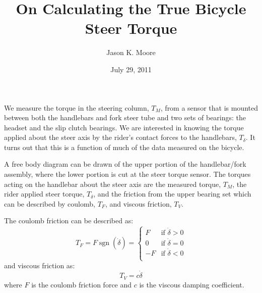 \documentclass[]{article}
\title{On Calculating the True Bicycle Steer Torque}
\author{Jason K. Moore}
\date{July 29, 2011}
\newcommand{\sgn}{\operatorname{sgn}}
\begin{document}
\maketitle
We measure the torque in the steering column, $T_M$, from a sensor that is
mounted between both the handlebars and fork steer tube and two sets of
bearings: the headset and the slip clutch bearings. We are interested in
knowing the torque applied about the steer axis by the rider's contact forces
to the handlebars, $T_\delta$. It turns out that this is a function of much of
the data measured on the bicycle.

A free body diagram can be drawn of the upper portion of the handlebar/fork
assembly, where the lower portion is cut at the steer torque sensor. The
torques acting on the handlebar about the steer axis are the measured torque,
$T_M$, the rider applied steer torque, $T_\delta$, and the friction from the
upper bearing set which can be described by coulomb, $T_F$, and viscous
friction, $T_V$.

The coulomb friction can be described as:
%
\begin{equation}
	T_F = F\sgn(\dot\delta) = \left\{
		\begin{array}{rl}
			F & \textrm{if $\dot{\delta}>0$}\\
			0 & \textrm{if $\dot{\delta}=0$}\\
			-F & \textrm{if $\dot{\delta}<0$}\\
		\end{array}
	\right.
\end{equation}
%
and viscous friction as:
%
\begin{equation}
	T_V = c\dot{\delta}
\end{equation}
%
where $F$ is the coulomb friction force and $c$ is the viscous damping
coefficient.
\end{document}
